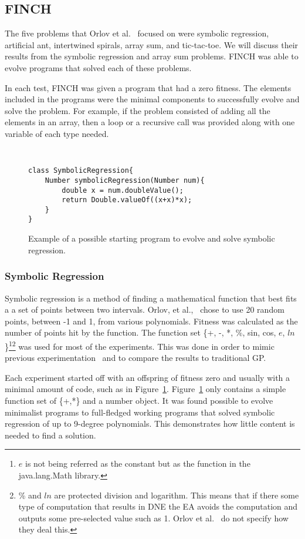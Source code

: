 \documentclass{sig-alternate}
\begin{document}
\subsection{FINCH}
The five problems that Orlov et al.~\cite{Assembly:2010} focused on were symbolic regression, artificial ant, intertwined spirals, array sum, and tic-tac-toe. We will discuss their results from the symbolic regression and array sum problems. FINCH was able to evolve programs that solved each of these problems.

In each test, FINCH was given a program that had a zero fitness. The elements included in the programs were the minimal components to successfully evolve and solve the problem. For example, if the problem consisted of adding all the elements in an array, then a loop or a recursive call was provided along with one variable of each type needed.

\begin{figure}
\centering
{\tt
\begin{verbatim}
class SymbolicRegression{
    Number symbolicRegression(Number num){
        double x = num.doubleValue();
        return Double.valueOf((x+x)*x);
    }
}
\end{verbatim}
}
\caption{Example of a possible starting program to evolve and solve symbolic regression.}
\label{regression}
\end{figure}
\subsubsection{Symbolic Regression}
Symbolic regression is a method of finding a mathematical function that best fits a a set of points between two intervals. Orlov, et al.,~\cite{FINCH:2011} chose to use 20 random points, between -1 and 1, from various polynomials. Fitness was calculated as the number of points hit by the function. The function set \{+, -, *, \%, sin, cos, $e$, $ln$\}\footnote{$e$ is not being referred as the constant but as the function in the java.lang.Math library.}\footnote{\% and $ln$ are protected division and logarithm. This means that if there some type of computation that results in DNE the EA avoids the computation and outputs some pre-selected value such as 1. Orlov et al.~\cite{FINCH:2011} do not specify how they deal this.} was used for most of the experiments. This was done in order to mimic previous experimentation~\cite{koza:1992} and to compare the results to traditional GP.

Each experiment started off with an offspring of fitness zero and usually with a minimal amount of code, such as in Figure~\ref{regression}. Figure~\ref{regression} only contains a simple function set of \{+,*\} and a number object. It was found possible  to evolve minimalist programs to full-fledged working programs that solved symbolic regression of up to 9-degree polynomials. This demonstrates how little content is needed to find a solution.\par
\end{document}
